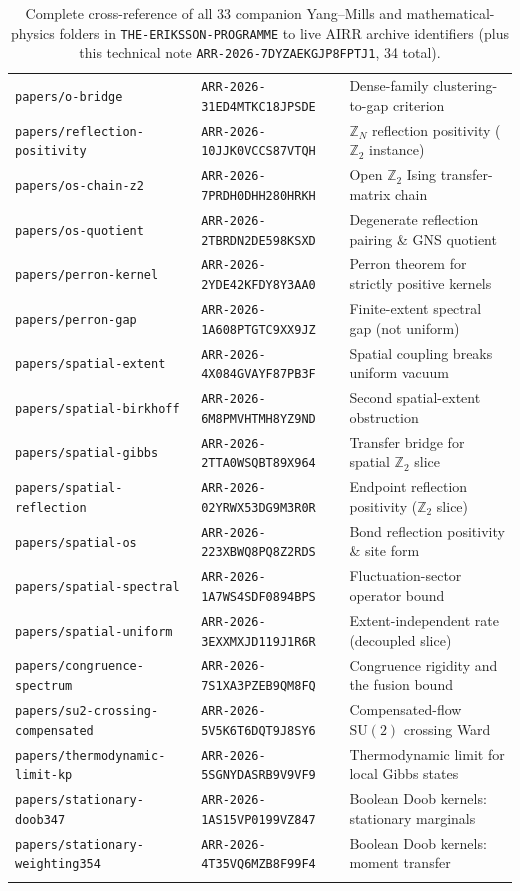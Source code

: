 \documentclass[11pt]{article}
\newcommand{\Z}{\mathbb{Z}}
\begin{document}
{\begin{longtable}{@{}>{\raggedright\arraybackslash}p{}>{\raggedright\arraybackslash}p{}>{\raggedright\arraybackslash}p{}@{}}
\texttt{papers/o-bridge} & \texttt{ARR-2026-31ED4MTKC18JPSDE} & Dense-family clustering-to-gap criterion \\
\texttt{papers/reflection-positivity} & \texttt{ARR-2026-10JJK0VCCS87VTQH} & $\Z_N$ reflection positivity ($\Z_2$ instance) \\
\texttt{papers/os-chain-z2} & \texttt{ARR-2026-7PRDH0DHH280HRKH} & Open $\Z_2$ Ising transfer-matrix chain \\
\texttt{papers/os-quotient} & \texttt{ARR-2026-2TBRDN2DE598KSXD} & Degenerate reflection pairing \& GNS quotient \\
\texttt{papers/perron-kernel} & \texttt{ARR-2026-2YDE42KFDY8Y3AA0} & Perron theorem for strictly positive kernels \\
\texttt{papers/perron-gap} & \texttt{ARR-2026-1A608PTGTC9XX9JZ} & Finite-extent spectral gap (not uniform) \\
\texttt{papers/spatial-extent} & \texttt{ARR-2026-4X084GVAYF87PB3F} & Spatial coupling breaks uniform vacuum \\
\texttt{papers/spatial-birkhoff} & \texttt{ARR-2026-6M8PMVHTMH8YZ9ND} & Second spatial-extent obstruction \\
\texttt{papers/spatial-gibbs} & \texttt{ARR-2026-2TTA0WSQBT89X964} & Transfer bridge for spatial $\Z_2$ slice \\
\texttt{papers/spatial-reflection} & \texttt{ARR-2026-02YRWX53DG9M3R0R} & Endpoint reflection positivity ($\Z_2$ slice) \\
\texttt{papers/spatial-os} & \texttt{ARR-2026-223XBWQ8PQ8Z2RDS} & Bond reflection positivity \& site form \\
\texttt{papers/spatial-spectral} & \texttt{ARR-2026-1A7WS4SDF0894BPS} & Fluctuation-sector operator bound \\
\texttt{papers/spatial-uniform} & \texttt{ARR-2026-3EXXMXJD119J1R6R} & Extent-independent rate (decoupled slice) \\
\texttt{papers/congruence-spectrum} & \texttt{ARR-2026-7S1XA3PZEB9QM8FQ} & Congruence rigidity and the fusion bound \\
\texttt{papers/su2-crossing-compensated} & \texttt{ARR-2026-5V5K6T6DQT9J8SY6} & Compensated-flow $\mathrm{SU}(2)$ crossing Ward \\
\texttt{papers/thermodynamic-limit-kp} & \texttt{ARR-2026-5SGNYDASRB9V9VF9} & Thermodynamic limit for local Gibbs states \\
\texttt{papers/stationary-doob347} & \texttt{ARR-2026-1AS15VP0199VZ847} & Boolean Doob kernels: stationary marginals \\
\texttt{papers/stationary-weighting354} & \texttt{ARR-2026-4T35VQ6MZB8F99F4} & Boolean Doob kernels: moment transfer \\
\bottomrule
\caption{Complete cross-reference of all 33 companion Yang--Mills and mathematical-physics
folders in \texttt{THE-ERIKSSON-PROGRAMME} to live AIRR archive identifiers (plus this
technical note \texttt{ARR-2026-7DYZAEKGJP8FPTJ1}, 34 total).}
\label{tab:airr}
\end{longtable}
}
\end{document}
